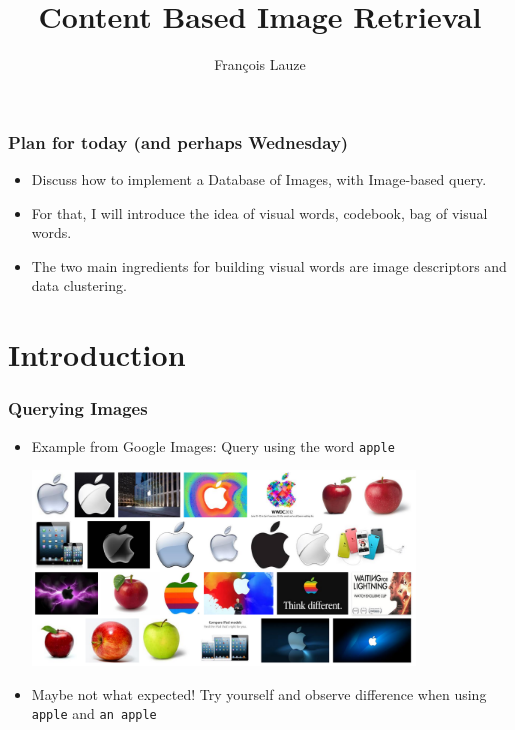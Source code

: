 \documentclass[10pt]{beamer}
\title{Content Based Image Retrieval}
\author[F.~Lauze] %
{Fran{\c c}ois Lauze}
\institute[DIKU] %
{
  Department of Computer Science\\
  University of Copenhagen
}
\date[2013 B2] %
\begin{document}
\maketitle






\begin{frame}
  \frametitle{Plan for today (and perhaps Wednesday)}
  \begin{itemize}
  \item Discuss how to implement a Database of Images, with
    Image-based query.
  \item For that, I will introduce the idea of visual words, codebook, bag of visual words.
  \item The two main ingredients for building visual words are image
    descriptors and data clustering.
  \end{itemize}
\end{frame}


\section{Introduction}

\begin{frame}
  \frametitle{Querying Images}
  
  \begin{itemize}
    \item Example from Google Images: Query using the word \texttt{apple}
    \begin{center}
      \includegraphics[width=0.8\textwidth]{FIGURES/GoogleAppleQuery}
    \end{center}
  \item Maybe not what expected! Try yourself and observe difference
    when using \texttt{apple} and \texttt{an apple}
  \end{itemize}
  
\end{frame}
\end{document}
